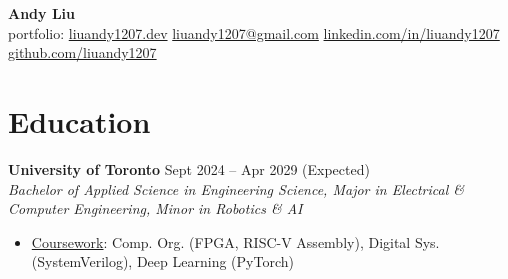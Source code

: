 \documentclass[10pt,letterpaper]{article}
\begin{document}
\begin{center}
\huge{\textbf{Andy Liu}} \\
\vspace{0.25em}
\small{{portfolio: 
    \href{https://liuandy1207.dev}{liuandy1207.dev}}
    \hspace{0.5em} \textbar\hspace{0.5em}
    \href{mailto: liuandy1207@gmail.com}{liuandy1207@gmail.com}
    \hspace{0.5em} \textbar\hspace{0.5em}
    \href{https://www.linkedin.com/in/liuandy1207/}{linkedin.com/in/liuandy1207}}
    \hspace{0.5em} \textbar\hspace{0.5em}
    \href{https://github.com/liuandy1207}{github.com/liuandy1207}
\end{center} \vspace{-0.7em}







\section{Education}

\textbf{University of Toronto} \hfill
Sept 2024 -- Apr 2029 (Expected) \\
\textit{Bachelor of Applied Science in Engineering Science, Major in Electrical \& Computer Engineering, Minor in Robotics \& AI} \hfill 
\begin{itemize}
    \item \underline{Coursework}: 
    Comp. Org. (FPGA, RISC-V Assembly), 
    Digital Sys. (SystemVerilog), Deep Learning (PyTorch)
\end{itemize} \vspace{0.25em}
\end{document}
